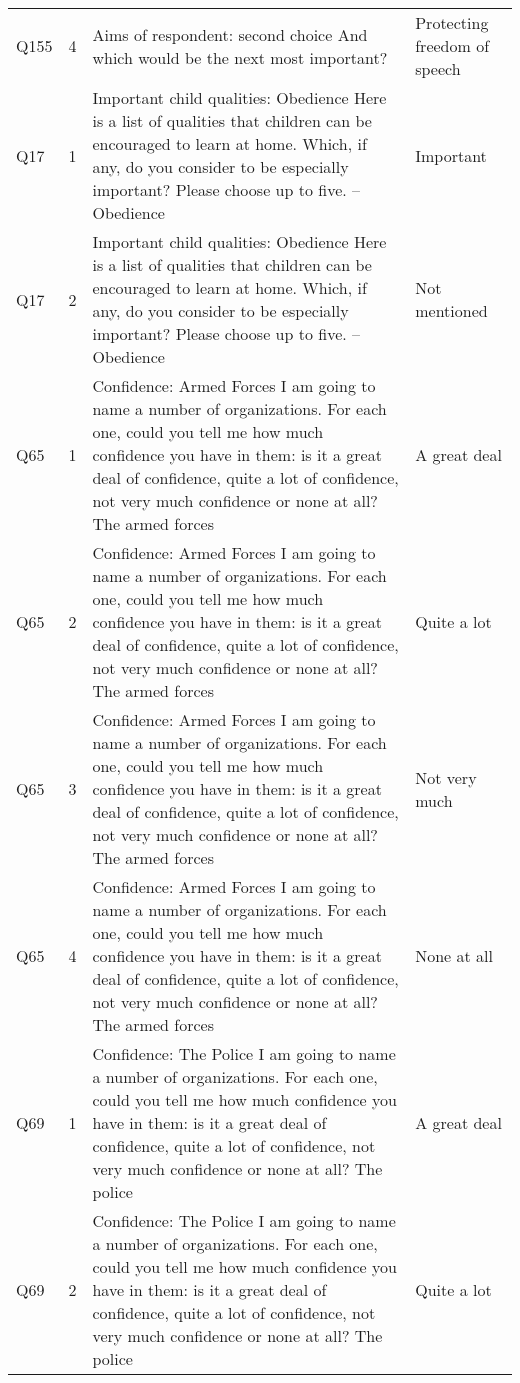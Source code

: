 \begin{tabular}{lrll}
Q155 & 4 & Aims of respondent: second choice And which would be the next most important? & Protecting freedom of speech \\
Q17 & 1 & Important child qualities: Obedience Here is a list of qualities that children can be encouraged to learn at home. Which, if any, do you consider to be especially important? Please choose up to five. – Obedience & Important \\
Q17 & 2 & Important child qualities: Obedience Here is a list of qualities that children can be encouraged to learn at home. Which, if any, do you consider to be especially important? Please choose up to five. – Obedience & Not mentioned \\
Q65 & 1 & Confidence: Armed Forces I am going to name a number of organizations. For each one, could you tell me how much confidence you have in them: is it a great deal of confidence, quite a lot of confidence, not very much confidence or none at all? The armed forces & A great deal \\
Q65 & 2 & Confidence: Armed Forces I am going to name a number of organizations. For each one, could you tell me how much confidence you have in them: is it a great deal of confidence, quite a lot of confidence, not very much confidence or none at all? The armed forces & Quite a lot \\
Q65 & 3 & Confidence: Armed Forces I am going to name a number of organizations. For each one, could you tell me how much confidence you have in them: is it a great deal of confidence, quite a lot of confidence, not very much confidence or none at all? The armed forces & Not very much \\
Q65 & 4 & Confidence: Armed Forces I am going to name a number of organizations. For each one, could you tell me how much confidence you have in them: is it a great deal of confidence, quite a lot of confidence, not very much confidence or none at all? The armed forces & None at all \\
Q69 & 1 & Confidence: The Police I am going to name a number of organizations. For each one, could you tell me how much confidence you have in them: is it a great deal of confidence, quite a lot of confidence, not very much confidence or none at all? The police & A great deal \\
Q69 & 2 & Confidence: The Police I am going to name a number of organizations. For each one, could you tell me how much confidence you have in them: is it a great deal of confidence, quite a lot of confidence, not very much confidence or none at all? The police & Quite a lot \\

\end{tabular}
